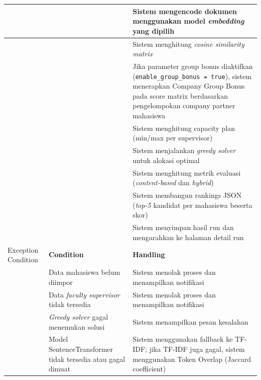 \begin{longtable}{|p{3.5cm}|p{4.5cm}|p{5cm}|}
\hline
 & & Sistem mengencode dokumen menggunakan model \textit{embedding} yang dipilih \\
\hline
 & & Sistem menghitung \textit{cosine similarity matrix} \\
\hline
 & & Jika parameter group bonus diaktifkan (\texttt{enable\_group\_bonus = true}), sistem menerapkan Company Group Bonus pada score matrix berdasarkan pengelompokan company partner mahasiswa \\
\hline
 & & Sistem menghitung capacity plan (min/max per supervisor) \\
\hline
 & & Sistem menjalankan \textit{greedy solver} untuk alokasi optimal \\
\hline
 & & Sistem menghitung metrik evaluasi (\textit{content-based} dan \textit{hybrid}) \\
\hline
 & & Sistem membangun rankings JSON (\textit{top-5} kandidat per mahasiswa beserta skor) \\
\hline
 & & Sistem menyimpan hasil run dan mengarahkan ke halaman detail run \\
\hline
Exception Condition & \textbf{Condition} & \textbf{Handling} \\
\hline
 & Data mahasiswa belum diimpor & Sistem menolak proses dan menampilkan notifikasi \\
\hline
 & Data \textit{faculty supervisor} tidak tersedia & Sistem menolak proses dan menampilkan notifikasi \\
\hline
 & \textit{Greedy solver} gagal menemukan solusi & Sistem menampilkan pesan kesalahan \\
\hline
 & Model SentenceTransformer tidak tersedia atau gagal dimuat & Sistem menggunakan fallback ke TF-IDF; jika TF-IDF juga gagal, sistem menggunakan Token Overlap (Jaccard coefficient) \\
\hline
\end{longtable}

